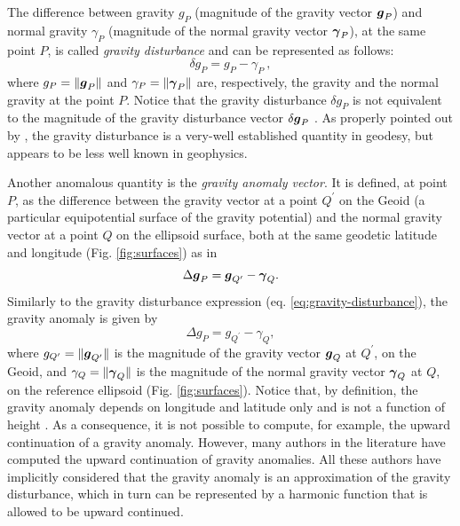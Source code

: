 \documentclass[extra]{gji}
\begin{document}
The difference between gravity $g_{P}$ (magnitude of the gravity 
vector $\mitbf{g}_{P}$) and normal gravity $\gamma_{P}$ 
(magnitude of the normal gravity vector $\mitbf{\gamma}_{P}$), at the 
same point $P$, is called \textit{gravity disturbance} 
\citep{heiskanen-moritz1967, hofmann-wellenhof-moritz2005} 
and can be represented as follows:
\begin{equation}
\delta g_{P} = g_{P} - \gamma_{P} \: ,
\label{eq:gravity-disturbance}
\end{equation}
where $g_{P} = \| \mitbf{g}_{P} \|$ and 
$\gamma_{P} = \| \mitbf{\gamma}_{P} \|$ are,
respectively, the gravity and the normal gravity at the
point $P$.
Notice that the gravity disturbance $\delta g_{P}$ is not equivalent 
to the magnitude of the gravity disturbance vector 
$\delta \mitbf{g}_{P}$ \citep{barthelmes2013, sanso_sideris2013}.
As properly pointed out by \citet{hackney-featherstone2003},
the gravity disturbance is a very-well established quantity in geodesy,
but appears to be less well known in geophysics.

Another anomalous quantity is the \textit{gravity anomaly vector}.
It is defined, at point $P$, as the difference between the gravity
vector at a point $Q^{\prime}$ on the Geoid (a particular
equipotential surface of the gravity potential) and the normal
gravity vector at a point $Q$ on the ellipsoid surface, both at the
same geodetic latitude and longitude (Fig. \ref{fig:surfaces}) as in
\begin{equation}
\Delta \mitbf{g}_{P} = \mitbf{g}_{Q^{\prime}} - \mitbf{\gamma}_{Q} .
\label{eq:gravity-anomaly-vector}
\end{equation}
Similarly to the gravity disturbance expression (eq.
\ref{eq:gravity-disturbance}), the gravity anomaly is given by
\begin{equation}
\Delta g_{P} = g_{Q^{\prime}} - \gamma_{Q} ,
\label{eq:gravity-anomaly}
\end{equation}
where $g_{Q^{\prime} } = \| \mitbf{g}_{Q^{\prime}} \|$ is
the magnitude of the gravity vector $\mitbf{g}_{Q}$ at $Q^{\prime}$, 
on the Geoid, and $\gamma_{Q} = \| \mitbf{\gamma}_{Q} \|$ is the 
magnitude of the normal gravity vector $\mitbf{\gamma}_{Q}$ at $Q$, 
on the reference ellipsoid (Fig. \ref{fig:surfaces}).
Notice that, by definition, the gravity anomaly depends on 
longitude and latitude only and is not a function of height 
\citep{barthelmes2013}. As a consequence, it is not possible to compute,
for example, the upward continuation of a gravity anomaly.
However, many authors in the literature have computed the upward 
continuation of gravity anomalies. All these authors have
implicitly considered that the gravity anomaly is an approximation of 
the gravity disturbance, which in turn can be represented by a 
harmonic function that is allowed to be upward continued.
\end{document}
